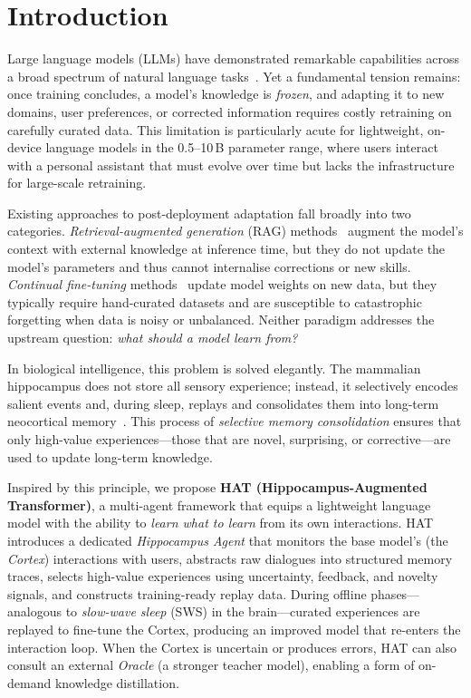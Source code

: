 \section{Introduction}
\label{sec:introduction}

Large language models (LLMs) have demonstrated remarkable capabilities across a broad spectrum of natural language tasks~\citep{brown2020language,touvron2023llama,openai2023gpt4}.
Yet a fundamental tension remains: once training concludes, a model's knowledge is \emph{frozen}, and adapting it to new domains, user preferences, or corrected information requires costly retraining on carefully curated data.
This limitation is particularly acute for lightweight, on-device language models in the 0.5--10\,B parameter range, where users interact with a personal assistant that must evolve over time but lacks the infrastructure for large-scale retraining.

Existing approaches to post-deployment adaptation fall broadly into two categories.
\emph{Retrieval-augmented generation} (RAG) methods~\citep{lewis2020retrieval,guu2020realm} augment the model's context with external knowledge at inference time, but they do not update the model's parameters and thus cannot internalise corrections or new skills.
\emph{Continual fine-tuning} methods~\citep{kirkpatrick2017overcoming,de2021continual} update model weights on new data, but they typically require hand-curated datasets and are susceptible to catastrophic forgetting when data is noisy or unbalanced.
Neither paradigm addresses the upstream question: \emph{what should a model learn from?}

In biological intelligence, this problem is solved elegantly.
The mammalian hippocampus does not store all sensory experience; instead, it selectively encodes salient events and, during sleep, replays and consolidates them into long-term neocortical memory~\citep{mcclelland1995there,kumaran2016learning}.
This process of \emph{selective memory consolidation} ensures that only high-value experiences---those that are novel, surprising, or corrective---are used to update long-term knowledge.

Inspired by this principle, we propose \textbf{HAT (Hippocampus-Augmented Transformer)}, a multi-agent framework that equips a lightweight language model with the ability to \emph{learn what to learn} from its own interactions.
HAT introduces a dedicated \emph{Hippocampus Agent} that monitors the base model's (the \emph{Cortex}) interactions with users, abstracts raw dialogues into structured memory traces, selects high-value experiences using uncertainty, feedback, and novelty signals, and constructs training-ready replay data.
During offline phases---analogous to \emph{slow-wave sleep} (SWS) in the brain---curated experiences are replayed to fine-tune the Cortex, producing an improved model that re-enters the interaction loop.
When the Cortex is uncertain or produces errors, HAT can also consult an external \emph{Oracle} (a stronger teacher model), enabling a form of on-demand knowledge distillation.

